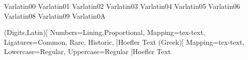 \DeclareFlexSymbol{\Gamma}  {Var}{latin}{00}
\DeclareFlexSymbol{\Delta}  {Var}{latin}{01}
\DeclareFlexSymbol{\Theta}  {Var}{latin}{02}
\DeclareFlexSymbol{\Lambda} {Var}{latin}{03}
\DeclareFlexSymbol{\Xi}     {Var}{latin}{04}
\DeclareFlexSymbol{\Pi}     {Var}{latin}{05}
\DeclareFlexSymbol{\Sigma}  {Var}{latin}{06}
\DeclareFlexSymbol{\Phi}    {Var}{latin}{08}
\DeclareFlexSymbol{\Psi}    {Var}{latin}{09}
\DeclareFlexSymbol{\Omega}  {Var}{latin}{0A}




\usepackage{acro} 

\usepackage[quiet]{mathspec}
\usepackage{xltxtra} %
\setmathfont(Digits,Latin)[
    Numbers={Lining,Proportional},
    Mapping=tex-text,
    Ligatures={Common, Rare, Historic},
]{Hoefler Text}
\setmathfont(Greek)[
    Mapping=tex-text,
    Lowercase=Regular,
    Uppercase=Regular
]{Hoefler Text}
\setmainfont[
    Mapping=tex-text,
    Ligatures={TeX, Common, Rare, Historic}
]{Hoefler Text}
